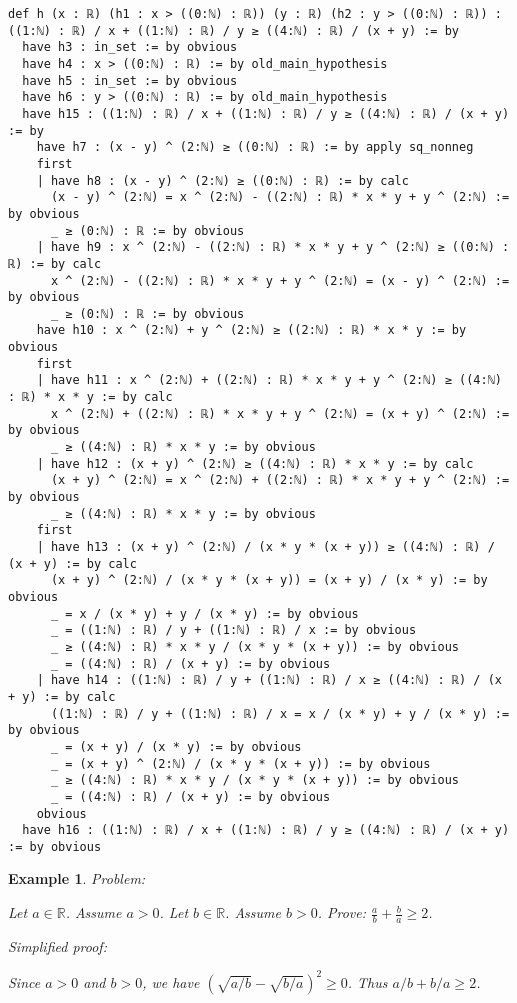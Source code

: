 \documentclass{article}
\newtheorem{example}{Example}
\begin{document}
\begin{tcolorbox}[colback=white!10, width=\linewidth]
\begin{lstlisting}[language=Lean4]
def h (x : ℝ) (h1 : x > ((0:ℕ) : ℝ)) (y : ℝ) (h2 : y > ((0:ℕ) : ℝ)) : ((1:ℕ) : ℝ) / x + ((1:ℕ) : ℝ) / y ≥ ((4:ℕ) : ℝ) / (x + y) := by
  have h3 : in_set := by obvious
  have h4 : x > ((0:ℕ) : ℝ) := by old_main_hypothesis
  have h5 : in_set := by obvious
  have h6 : y > ((0:ℕ) : ℝ) := by old_main_hypothesis
  have h15 : ((1:ℕ) : ℝ) / x + ((1:ℕ) : ℝ) / y ≥ ((4:ℕ) : ℝ) / (x + y) := by
    have h7 : (x - y) ^ (2:ℕ) ≥ ((0:ℕ) : ℝ) := by apply sq_nonneg
    first
    | have h8 : (x - y) ^ (2:ℕ) ≥ ((0:ℕ) : ℝ) := by calc
      (x - y) ^ (2:ℕ) = x ^ (2:ℕ) - ((2:ℕ) : ℝ) * x * y + y ^ (2:ℕ) := by obvious
      _ ≥ (0:ℕ) : ℝ := by obvious
    | have h9 : x ^ (2:ℕ) - ((2:ℕ) : ℝ) * x * y + y ^ (2:ℕ) ≥ ((0:ℕ) : ℝ) := by calc
      x ^ (2:ℕ) - ((2:ℕ) : ℝ) * x * y + y ^ (2:ℕ) = (x - y) ^ (2:ℕ) := by obvious
      _ ≥ (0:ℕ) : ℝ := by obvious
    have h10 : x ^ (2:ℕ) + y ^ (2:ℕ) ≥ ((2:ℕ) : ℝ) * x * y := by obvious
    first
    | have h11 : x ^ (2:ℕ) + ((2:ℕ) : ℝ) * x * y + y ^ (2:ℕ) ≥ ((4:ℕ) : ℝ) * x * y := by calc
      x ^ (2:ℕ) + ((2:ℕ) : ℝ) * x * y + y ^ (2:ℕ) = (x + y) ^ (2:ℕ) := by obvious
      _ ≥ ((4:ℕ) : ℝ) * x * y := by obvious
    | have h12 : (x + y) ^ (2:ℕ) ≥ ((4:ℕ) : ℝ) * x * y := by calc
      (x + y) ^ (2:ℕ) = x ^ (2:ℕ) + ((2:ℕ) : ℝ) * x * y + y ^ (2:ℕ) := by obvious
      _ ≥ ((4:ℕ) : ℝ) * x * y := by obvious
    first
    | have h13 : (x + y) ^ (2:ℕ) / (x * y * (x + y)) ≥ ((4:ℕ) : ℝ) / (x + y) := by calc
      (x + y) ^ (2:ℕ) / (x * y * (x + y)) = (x + y) / (x * y) := by obvious
      _ = x / (x * y) + y / (x * y) := by obvious
      _ = ((1:ℕ) : ℝ) / y + ((1:ℕ) : ℝ) / x := by obvious
      _ ≥ ((4:ℕ) : ℝ) * x * y / (x * y * (x + y)) := by obvious
      _ = ((4:ℕ) : ℝ) / (x + y) := by obvious
    | have h14 : ((1:ℕ) : ℝ) / y + ((1:ℕ) : ℝ) / x ≥ ((4:ℕ) : ℝ) / (x + y) := by calc
      ((1:ℕ) : ℝ) / y + ((1:ℕ) : ℝ) / x = x / (x * y) + y / (x * y) := by obvious
      _ = (x + y) / (x * y) := by obvious
      _ = (x + y) ^ (2:ℕ) / (x * y * (x + y)) := by obvious
      _ ≥ ((4:ℕ) : ℝ) * x * y / (x * y * (x + y)) := by obvious
      _ = ((4:ℕ) : ℝ) / (x + y) := by obvious
    obvious
  have h16 : ((1:ℕ) : ℝ) / x + ((1:ℕ) : ℝ) / y ≥ ((4:ℕ) : ℝ) / (x + y) := by obvious

\end{lstlisting}
\end{tcolorbox}


\begin{example}
Problem:
\begin{tcolorbox}[colback=yellow!10, width=\linewidth]
Let $a\in\mathbb{R}$. Assume $a > 0$.
    Let $b\in\mathbb{R}$. Assume $b > 0$.
    Prove: $\frac{a}{b} + \frac{b}{a} \ge 2$.
\end{tcolorbox}

Simplified proof:
\begin{tcolorbox}[colback=blue!10, width=\linewidth]
Since $a>0$ and $b>0$, we have $(\sqrt{a/b} - \sqrt{b/a})^2 \ge 0$. Thus $a/b + b/a \ge 2$.
\end{tcolorbox}
\end{example}
\end{document}
